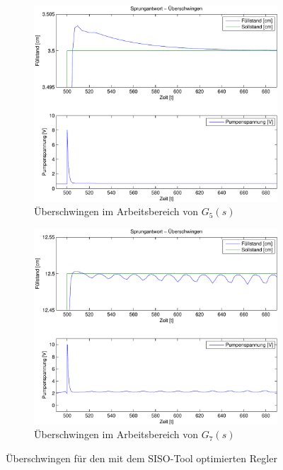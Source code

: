 \begin{figure}[h!]
	\begin{subfigure}{0.475\textwidth}
		\includegraphics[width=1\textwidth]{11/L5_step_overshoot_plot.pdf}
		\caption{Überschwingen im Arbeitsbereich von $G_5(s)$}
	\end{subfigure}
	\hfill{}
	\begin{subfigure}{0.475\textwidth}
		\includegraphics[width=1\textwidth]{11/L7_step_overshoot_plot.pdf}
		\caption{Überschwingen im Arbeitsbereich von $G_7(s)$}
	\end{subfigure}
	\caption{Überschwingen für den mit dem SISO-Tool optimierten Regler}
\end{figure}


